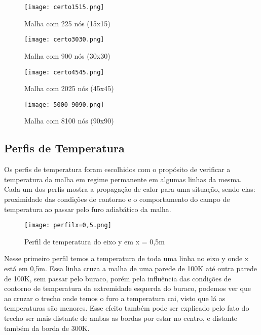 \documentclass[article]{abntex2}
\begin{document}
\begin{figure}[H]
    \begin{center}
       
        \texttt{[image: certo1515.png]} 
        \caption{Malha com 225 nós (15x15)}
    \end{center}
\end{figure}
\begin{figure}[H]
    \begin{center}
       
        \texttt{[image: certo3030.png]} 
        \caption{Malha com 900 nós (30x30)}
    \end{center}
\end{figure}
\begin{figure}[H]
    \begin{center}
       
        \texttt{[image: certo4545.png]} 
        \caption{Malha com 2025 nós (45x45)}
    \end{center}
\end{figure}
\begin{figure}[H]
    \begin{center}
       
        \texttt{[image: 5000-9090.png]} 
        \caption{Malha com 8100 nós (90x90)}
    \end{center}
\end{figure}


\subsection{Perfis de Temperatura}
Os perfis de temperatura foram escolhidos com o propósito de verificar a temperatura da malha em regime permanente em algumas linhas da mesma. Cada um dos perfis mostra a propagação de calor para uma situação, sendo elas: proximidade das condições de contorno e o comportamento do campo de temperatura ao passar pelo furo adiabático da malha.

\begin{figure}[H]
    \begin{center}
       
        \texttt{[image: perfilx=0,5.png]} 
        \caption{Perfil de temperatura do eixo y em x = 0,5m}
    \end{center}
\end{figure}

       
Nesse primeiro perfil temos a temperatura de toda uma linha no eixo y onde x está em 0,5m. Essa linha cruza a malha de uma parede de 100K até outra parede de 100K, sem passar pelo buraco, porém pela influência das condições de contorno de temperatura da extremidade esquerda do buraco, podemos ver que ao cruzar o trecho onde temos o furo a temperatura cai, visto que lá as temperaturas são menores. Esse efeito também pode ser explicado pelo fato do trecho ser mais distante de ambas as bordas por estar no centro, e distante também da borda de 300K.
\end{document}
